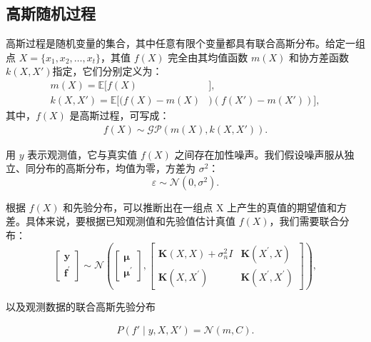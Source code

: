 \subsection{高斯随机过程} 高斯过程是随机变量的集合，其中任意有限个变量都具有联合高斯分布。给定一组点 $X = \{x_1,x_2,\ldots,x_t\}$，其值 $f(X)$ 完全由其均值函数 $m(X)$ 和协方差函数 $k(X,X')$指定，它们分别定义为：
\begin{equation}
\begin{aligned}
m(X)=\mathbb{E}[f(X)&], \\
k(X,X')=\mathbb{E}[(f(X)-m(X)&)(f(X')-m(X'))],
\end{aligned}
\end{equation}
其中，$f(X)$ 是高斯过程，可写成：
\begin{equation}
\begin{aligned}
f(X) \sim \mathcal{GP}(m(X), k(X,X')).
\end{aligned}
\end{equation}

用 $y$ 表示观测值，它与真实值 $f(X)$ 之间存在加性噪声。我们假设噪声服从独立、同分布的高斯分布，均值为零，方差为 $\sigma^2$：
$$\varepsilon \sim \mathcal{N}(0,\sigma^2).$$

根据 $f(X)$ 和先验分布，可以推断出在一组点 X 上产生的真值的期望值和方差。具体来说，要根据已知观测值和先验值估计真值 $f(X)$，我们需要联合分布：
\begin{equation}
\left[\begin{array}{c}
\boldsymbol{y} \\
\boldsymbol{f}^{\prime}
\end{array}\right] \sim \mathcal{N}\left(\left[\begin{array}{c}
\boldsymbol{\mu} \\
\boldsymbol{\mu}^{\prime}
\end{array}\right],\left[\begin{array}{cc}
\boldsymbol{K}(X, X)+\sigma_{n}^{2} I & \boldsymbol{K}\left(X^{\prime}, X\right) \\
\boldsymbol{K}\left(X, X^{\prime}\right) & \boldsymbol{K}\left(X^{\prime}, X^{\prime}\right)
\end{array}\right]\right),
\end{equation}

以及观测数据的联合高斯先验分布

\begin{equation}
\begin{aligned}
P(f'\mid y,X,X')=\mathcal{N}(m,C).
\end{aligned}
\end{equation}

